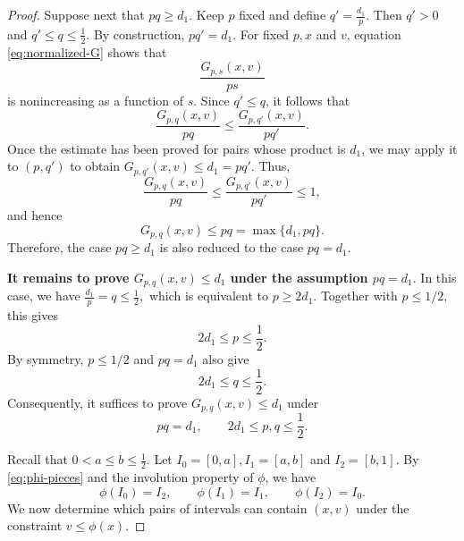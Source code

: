 \documentclass[10pt,a4paper]{amsart}
\begin{document}
\begin{proof}
Suppose next that $pq\geq d_1$. Keep $p$ fixed and define
$
 q'=\frac{d_1}{p}.
$
Then $q'>0$ and
$
 q'\leq q\leq\frac12.
$
By construction,
$
 pq'=d_1.
$
For fixed $p,x$ and $v$, equation \eqref{eq:normalized-G} shows that
\begin{equation*}
 \frac{G_{p,s}(x,v)}{ps}
\end{equation*}
is nonincreasing as a function of $s$. Since $q'\leq q$, it follows
that
\begin{equation*}
 \frac{G_{p,q}(x,v)}{pq}
 \leq
 \frac{G_{p,q'}(x,v)}{pq'}.
\end{equation*}
Once the estimate has been proved for pairs whose product is $d_1$, we
may apply it to $(p,q')$ to obtain
$
 G_{p,q'}(x,v)\leq d_1=pq'.
$
Thus,
\begin{equation*}
 \frac{G_{p,q}(x,v)}{pq}
 \leq
 \frac{G_{p,q'}(x,v)}{pq'}
 \leq1,
\end{equation*}
and hence
\begin{equation*}
 G_{p,q}(x,v)
 \leq pq
 =
 \max\{d_1,pq\}.
\end{equation*}
Therefore, the case $pq\geq d_1$ is also reduced to the case $pq=d_1$.


















\textbf{It remains to prove
$
 G_{p,q}(x,v)\leq d_1
$
under the assumption
$
 pq=d_1.
$}
In this case, we have
$
 \frac{d_1}{p}=q\leq\frac12,
$
which is equivalent to
$
 p\geq2d_1.
$
Together with $p\leq1/2$, this gives
\begin{equation*}
 2d_1\leq p\leq\frac12.
\end{equation*}
By symmetry, $p\leq1/2$ and $pq=d_1$ also give
\begin{equation*}
 2d_1\leq q\leq\frac12.
\end{equation*}
Consequently, it suffices to prove $
 G_{p,q}(x,v)\leq d_1
$ under
\begin{equation*}
 pq=d_1,
 \qquad
 2d_1\leq p,q\leq\frac12.
\end{equation*}



Recall that $0<a\leq b\leq\frac12$.
Let
$
 I_0=[0,a],
 I_1=[a,b]
$
and
$
 I_2=[b,1].
$
By \eqref{eq:phi-pieces} and the involution property of $\phi$, we have
\begin{equation*}
 \phi(I_0)=I_2,
 \qquad
 \phi(I_1)=I_1,
 \qquad
 \phi(I_2)=I_0.
\end{equation*}
We now determine which pairs of intervals can contain $(x,v)$ under
the constraint $v\leq\phi(x)$.


\end{proof}
\end{document}
